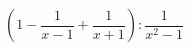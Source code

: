 \begin{ex}[type=expression]
	\begin{condition}
		\( \left( 1-\dfrac{1}{x-1}+\dfrac{1}{x+1} \right) :\dfrac{1}{x^2-1}\)
	\end{condition}
\end{ex}
